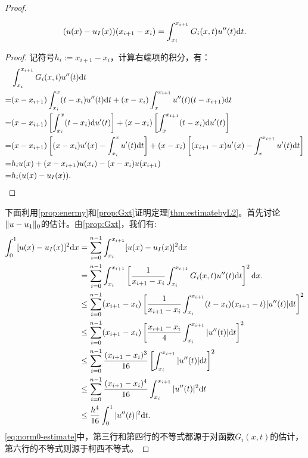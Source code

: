 \begin{proof}
\begin{proposition}
\begin{equation}
    (u(x)-u_{I}(x))(x_{i+1}-x_{i})=\int_{x_{i}}^{x_{i+1}}G_{i}(x,t)u''(t)\mathrm{d} t.
  \end{equation}
\end{proposition}
\begin{proof}
  记符号$h_{i}:=x_{i+1}-x_{i}$，计算右端项的积分，有：
  \begin{equation}
    \begin{aligned}
      &\int_{x_{i}}^{x_{i+1}}G_{i}(x,t)u''(t)\mathrm{d} t\\
      =&(x-x_{i+1})\int_{x_{i}}^{x}(t-x_{i})u''(t)\mathrm{d} t+(x-x_{i})\int_{x}^{x_{i+1}}u''(t)(t-x_{i+1})\mathrm{d} t\\
      =&(x-x_{i+1})\left[\int_{x_{i}}^{x}(t-x_{i})\mathrm{d} u'(t)\right]+(x-x_{i})\left[\int_{x}^{x_{i+1}}(t-x_{i})\mathrm{d} u'(t)\right]\\
      =&(x-x_{i+1})\left[(x-x_{i})u'(x)-\int_{x_{i}}^{x}u'(t)\mathrm{d} t\right]+(x-x_{i})\left[(x_{i+1}-x)u'(x)-\int_{x}^{x_{i+1}}u'(t)\mathrm{d} t\right]\\
      =&h_{i}u(x)+(x-x_{i+1})u(x_{i})-(x-x_{i})u(x_{i+1})\\
      =&h_{i}(u(x)-u_{I}(x)).\\
    \end{aligned}
  \end{equation}
  \end{proof}
  下面利用\ref{prop:enermy}和\ref{prop:Gxt}证明定理\ref{thm:estimatebyL2}。首先讨论$\|u-u_{1}\|_{0}$的估计。由\ref{prop:Gxt}，我们有:
  \begin{equation}
    \label{eq:norm0-estimate}
    \begin{aligned}
      \int_{0}^{1}[u(x)-u_{I}(x)]^{2}\dif x&=\sum_{i=0}^{n-1}\int_{x_{i}}^{x_{i+1}}[u(x)-u_{I}(x)]^{2}\dif x\\
      &=\sum_{i=0}^{n-1}\int_{x_{i}}^{x_{i+1}}\left[\frac{1}{x_{i+1}-x_{i}}\int_{x_{i}}^{x_{i+1}}G_{i}(x,t)u''(t)\dif t\right]^{2}\dif x.\\
      &\le\sum_{i=0}^{n-1}(x_{i+1}-x_{i})\left[\frac{1}{x_{i+1}-x_{i}}\int_{x_{i}}^{x_{i+1}}(t-x_{i})(x_{i+1}-t)|u''(t)|\dif t\right]^{2}\\
      &\le\sum_{i=0}^{n-1}(x_{i+1}-x_{i})\left[\frac{x_{i+1}-x_{i}}{4}\int_{x_{i}}^{x_{i+1}}|u''(t)|\dif t\right]^{2}\\
      &\le\sum_{i=0}^{n-1}\frac{(x_{i+1}-x_{i})^{3}}{16}\left[\int_{x_{i}}^{x_{i+1}}|u''(t)|\dif t\right]^{2}\allowdisplaybreaks[4]\\
      &\le\sum_{i=0}^{n-1}\frac{(x_{i+1}-x_{i})^{4}}{16}\int_{x_{i}}^{x_{i+1}}|u''(t)|^{2}\dif t\\
      &\le\frac{h^4}{16}\int_{0}^{1}|u''(t)|^{2}\dif t.
    \end{aligned}
  \end{equation}
  \eqref{eq:norm0-estimate}中，第三行和第四行的不等式都源于对函数$G_{i}(x,t)$的估计，第六行的不等式则源于柯西不等式。
  

\end{proof}
